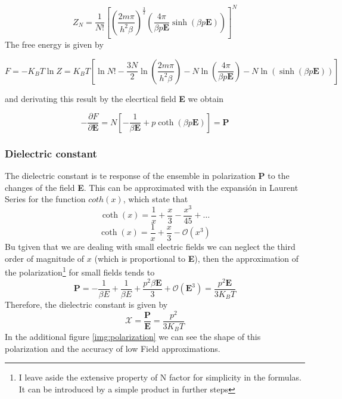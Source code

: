 \documentclass{article}
\begin{document}
\begin{equation}
       Z_N = \frac{1}{N!}\left[\left( \frac{2m\pi}{h^2 \beta} \right)^{\frac{3}{2}} \left( \frac{4\pi}{\beta p \textbf{E}} \sinh{\left(\beta p \textbf{E}\right)} \right)\right]^{N}
\end{equation}
The free energy is given by

\begin{equation}
    F = -K_B T \ln{Z} = K_B T\left[ \ln{N!}-\frac{3N}{2} \ln{\left( \frac{2m\pi}{h^2 \beta}\right)} - N\ln{\left( \frac{4\pi}{\beta p \textbf{E}} \right)} - N \ln{\left( \sinh{\left(\beta p \textbf{E}\right)} \right)}\right]
\end{equation}

and derivating this result by the elecrtical field \textbf{E} we obtain

\begin{equation}
 -\frac{\partial F}{\partial \textbf{E}} = N\left[-\frac{1}{\beta\textbf{E}} + p \coth{\left(\beta p \textbf{E}\right)}\right] = \textbf{P}
\end{equation}
 \subsubsection*{Dielectric constant}
 The dielectric constant is te response of the ensemble in polarization \textbf{P} to the changes of the field \textbf{E}. This can be approximated with the expansión in Laurent Series for the function $coth(x)$, which state that
\begin{equation}
    \coth (x) = \frac{1}{x} + \frac{x}{3} - \frac{x^3}{45} + \ldots
\end{equation}
\begin{equation*}
    \coth (x) = \frac{1}{x} + \frac{x}{3} - \mathcal{O}(x^3)
\end{equation*}
Bu tgiven that we are dealing with small electric fields we can neglect the third order of magnitude of $x$ (which is proportional to \textbf{E}), then the approximation of the polarization\footnote{I leave aside the extensive property of N factor for simplicity in the formulas. It can be introduced by a simple product in further steps} for small fields tends to
\begin{equation}
    \textbf{P} = -\frac{1}{\beta E} + \frac{1}{\beta E} + \frac{p^2 \beta \textbf{E}}{3} +  \mathcal{O}(\textbf{E}^3) = \frac{p^2 \textbf{E}}{3 K_B T}
\end{equation}
Therefore, the dielectric constant is given by
\begin{equation}
    \mathcal{X} = \frac{\textbf{P}}{\textbf{E}} =  \frac{p^2}{3 K_B T}
\end{equation}
In the additional figure \ref{img:polarization} we can see the shape of this polarization and the accuracy of low Field approximations. 
\end{document}
